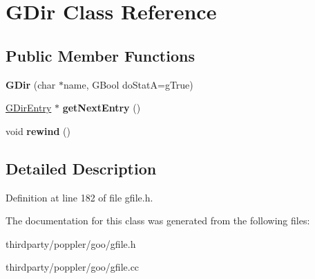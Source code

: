 \hypertarget{class_g_dir}{}\section{G\+Dir Class Reference}
\label{class_g_dir}
\subsection*{Public Member Functions}
\begin{DoxyCompactItemize}
\item 
\mbox{\label{class_g_dir_a9ada417903a2a4efd8475a3f0167f7b7}} 
{\bfseries G\+Dir} (char $\ast$name, G\+Bool do\+StatA=g\+True)
\item 
\mbox{\label{class_g_dir_aaff53ee72379116c0ecb9d9c864171aa}} 
\hyperlink{class_g_dir_entry}{G\+Dir\+Entry} $\ast$ {\bfseries get\+Next\+Entry} ()
\item 
\mbox{\label{class_g_dir_a7b3593214673fab334a9c7cf9ca7b344}} 
void {\bfseries rewind} ()
\end{DoxyCompactItemize}


\subsection{Detailed Description}


Definition at line 182 of file gfile.\+h.



The documentation for this class was generated from the following files\+:\begin{DoxyCompactItemize}
\item 
thirdparty/poppler/goo/gfile.\+h\item 
thirdparty/poppler/goo/gfile.\+cc\end{DoxyCompactItemize}

